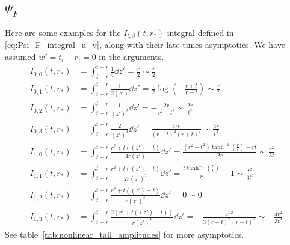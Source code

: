 \documentclass[reprint,aps,physrev,superscriptaddress,10pt,notitlepage,prd,nofootinbib,onecolumn]{revtex4-2}
\newcommand{\tref}[1]{table~\ref{#1}}
\begin{document}
\subsection{$\Psi_F$}
\label{sec:Psi_F_details}
Here are some examples for the $I_{l,\beta}(t,r_*)$ integral defined in \eqref{eq:Psi_F_integral_u_v}, along with their late times asymptotics.
We have assumed $w'=t_i-r_i=0$ in the arguments.
\begin{align}
  \label{eq:I_integral_examples}
  I_{0,0}(t,r_*) &= \int_{t-r}^{t+r} \frac{1}{4} \dd{z'} = \frac{r}{2} \sim \frac{r}{2} \nonumber \\
I_{0,1}(t,r_*) &= \int_{t-r}^{t+r} \frac{1}{2 (z')} \dd{z'} = \frac{1}{2} \log \left(-\frac{r+t}{r-t}\right) \sim \frac{r}{t} \nonumber \\
I_{0,2}(t,r_*) &= \int_{t-r}^{t+r} \frac{1}{(z')^2} \dd{z'} = -\frac{2 r}{r^2-t^2} \sim \frac{2 r}{t^2} \nonumber \\
I_{0,3}(t,r_*) &= \int_{t-r}^{t+r} \frac{2}{(z')^3} \dd{z'} = \frac{4 r t}{(r-t)^2 (r+t)^2} \sim \frac{4 r}{t^3} \nonumber \\
I_{1,0}(t,r_*) &= \int_{t-r}^{t+r} \frac{r^2+t ((z')-t)}{4 r (z')} \dd{z'} = \frac{\left(r^2-t^2\right) \tanh ^{-1}\left(\frac{r}{t}\right)+r t}{2 r} \sim \frac{r^2}{3 t} \nonumber \\
I_{1,1}(t,r_*) &= \int_{t-r}^{t+r} \frac{r^2+t ((z')-t)}{2 r (z')^2} \dd{z'} = \frac{t \tanh ^{-1}\left(\frac{r}{t}\right)}{r}-1 \sim \frac{r^2}{3 t^2} \nonumber \\
I_{1,2}(t,r_*) &= \int_{t-r}^{t+r} \frac{r^2+t ((z')-t)}{r (z')^3} \dd{z'} = 0 \sim 0 \nonumber \\
I_{1,3}(t,r_*) &= \int_{t-r}^{t+r} \frac{2 \left(r^2+t ((z')-t)\right)}{r (z')^4} \dd{z'} = -\frac{4 r^2}{3 (r-t)^2 (r+t)^2} \sim -\frac{4 r^2}{3 t^4}
\end{align}
See \tref{tab:nonlinear_tail_amplitudes} for more asymptotics.
\end{document}
